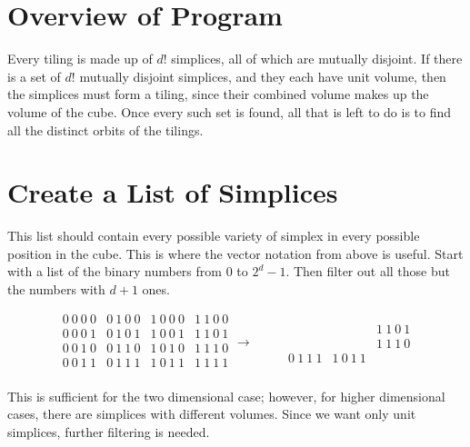 \documentclass[12pt]{scrippsthesis}
\theoremstyle{definition}
\theoremstyle{remark}
\theoremstyle{plain}
\begin{document}

\section{Overview of Program}
\label{sec: overview of program}

Every tiling is made up of $d!$ simplices, all of which are mutually disjoint.  If there is a set of $d!$ mutually disjoint simplices, and they each have unit volume, then the simplices must form a tiling, since their combined volume makes up the volume of the cube.  Once every such set is found, all that is left to do is to find all the distinct orbits of the tilings.

\section{Create a List of Simplices}
\label{sec:Create a List of Simplices}

This list should contain every possible variety of simplex in every possible position in the cube.  This is where the vector notation from above is useful.  Start with a list of the binary numbers from $0$ to $2^d-1$.  Then filter out all those but the numbers with $d+1$ ones.

$$
\begin{array}{cccc}
0\ 0\ 0\ 0 & 0\ 1\ 0\ 0 & 1\ 0\ 0\ 0 & 1\ 1\ 0\ 0 \\
0\ 0\ 0\ 1 & 0\ 1\ 0\ 1 & 1\ 0\ 0\ 1 & 1\ 1\ 0\ 1 \\
0\ 0\ 1\ 0 & 0\ 1\ 1\ 0 & 1\ 0\ 1\ 0 & 1\ 1\ 1\ 0 \\
0\ 0\ 1\ 1 & 0\ 1\ 1\ 1 & 1\ 0\ 1\ 1 & 1\ 1\ 1\ 1 \\
\end{array}
\to
\begin{array}{cccc}
\ \ \ \ \ \ \ &  &  & \\
 &&  & 1\ 1\ 0\ 1 \\
 &  &  & 1\ 1\ 1\ 0 \\
 & 0\ 1\ 1\ 1 & 1\ 0\ 1\ 1 &  \\
\end{array}
$$

This is sufficient for the two dimensional case; however, for higher dimensional cases, there are simplices with different volumes.  Since we want only unit simplices, further filtering is needed.
\end{document}
